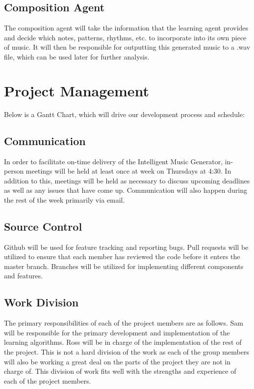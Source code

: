 \documentclass{article}
\begin{document}
\subsection{Composition Agent}
The composition agent will take the information that the learning agent provides and decide which notes, patterns, rhythms, etc. to incorporate into its own piece of music. It will then be responsible for outputting this generated music to a .wav file, which can be used later for further analysis.

\section{Project Management}
Below is a Gantt Chart, which will drive our development process and schedule:
\begin{figure}[ht]
\end{figure}

\subsection{Communication}
In order to facilitate on-time delivery of the Intelligent Music Generator, in-person meetings will be held at least once at week on Thursdays at 4:30. In addition to this, meetings will be held as necessary to discuss upcoming deadlines as well as any issues that have come up. Communication will also happen during the rest of the week primarily via email.

\subsection{Source Control}
Github will be used for feature tracking and reporting bugs.  Pull requests will be utilized to ensure that each member has reviewed the code before it enters the master branch.  Branches will be utilized for implementing different components and features.

\subsection{Work Division}
The primary responsibilities of each of the project members are as follows. Sam will be responsible for the primary development and implementation of the learning algorithms. Ross will be in charge of the implementation of the rest of the project. This is not a hard division of the work as each of the group members will also be working a great deal on the parts of the project they are not in charge of. This division of work fits well with the strengths and experience of each of the project members.
\end{document}
